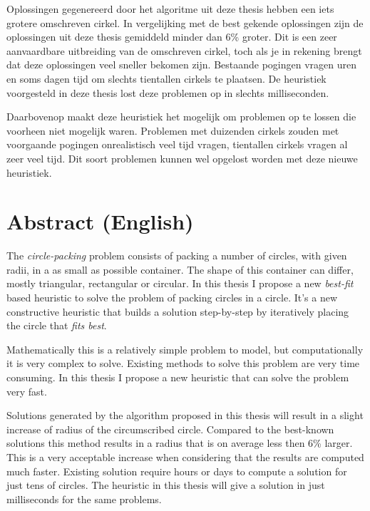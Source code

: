 \documentclass[12pt,a4paper,oneside]{book}
\begin{document}
Oplossingen gegenereerd door het algoritme uit deze thesis hebben een iets grotere omschreven cirkel.
In vergelijking met de best gekende oplossingen zijn de oplossingen uit deze thesis gemiddeld minder dan 6\% groter.
Dit is een zeer aanvaardbare uitbreiding van de omschreven cirkel, toch als je in rekening brengt dat deze oplossingen veel sneller bekomen zijn.
Bestaande pogingen vragen uren en soms dagen tijd om slechts tientallen cirkels te plaatsen.
De heuristiek voorgesteld in deze thesis lost deze problemen op in slechts milliseconden.

Daarbovenop maakt deze heuristiek het mogelijk om problemen op te lossen die voorheen niet mogelijk waren.
Problemen met duizenden cirkels zouden met voorgaande pogingen onrealistisch veel tijd vragen, tientallen cirkels vragen al zeer veel tijd.
Dit soort problemen kunnen wel opgelost worden met deze nieuwe heuristiek.

\newpage

\chapter*{Abstract (English)}

The \textit{circle-packing} problem consists of packing a number of circles, with given radii, in a as small as possible container.
The shape of this container can differ, mostly triangular, rectangular or circular.
In this thesis I propose a new \textit{best-fit} based heuristic to solve the problem of packing circles in a circle.
It's a new constructive heuristic that builds a solution step-by-step by iteratively placing the circle that \textit{fits best}.

Mathematically this is a relatively simple problem to model, but computationally it is very complex to solve.
Existing methods to solve this problem are very time consuming.
In this thesis I propose a new heuristic that can solve the problem very fast.

Solutions generated by the algorithm proposed in this thesis will result in a slight increase of radius of the circumscribed circle.
Compared to the best-known solutions this method results in a radius that is on average less then 6\% larger.
This is a very acceptable increase when considering that the results are computed much faster.
Existing solution require hours or days to compute a solution for just tens of circles.
The heuristic in this thesis will give a solution in just milliseconds for the same problems.
\end{document}
